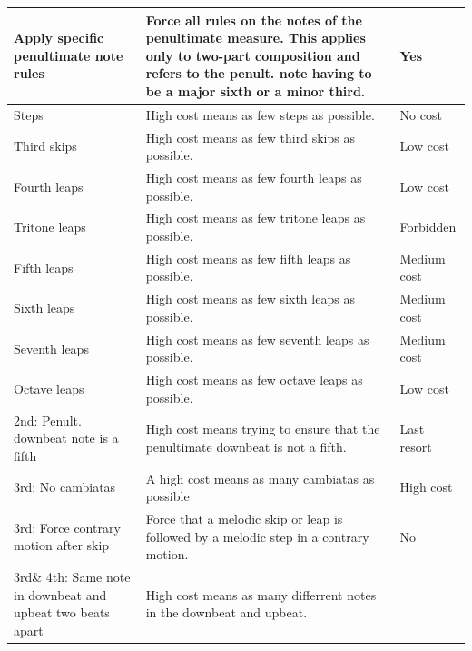 \begin{table}[!h]
\begin{adjustbox}{center}
\begin{tabular}{|m{}|m{}|m{}<{\centering}|}
        \cellcolor[HTML]{C8D6FF}Apply specific penultimate note rules &
          Force all rules on the notes of the penultimate measure. This applies only to two-part composition and  refers to the penult. note having to be a major sixth or a minor third. &
          Yes \\ \hline
        \hline
        \cellcolor[HTML]{BCE08D}Steps &
          High cost means as few steps as possible. &
          No cost \\ \hline
        \cellcolor[HTML]{BCE08D}Third skips &
          High cost means as few third skips as possible. &
          Low cost \\ \hline
        \cellcolor[HTML]{BCE08D}Fourth leaps &
          High cost means as few fourth leaps as possible. &
          Low cost \\ \hline
        \cellcolor[HTML]{BCE08D}Tritone leaps&
          High cost means as few tritone leaps as possible. &
          Forbidden \\ \hline
        \cellcolor[HTML]{BCE08D}Fifth leaps&
          High cost means as few fifth leaps as possible. &
          Medium cost \\ \hline
        \cellcolor[HTML]{BCE08D}Sixth leaps&
          High cost means as few sixth leaps as possible. &
          Medium cost \\ \hline
        \cellcolor[HTML]{BCE08D}Seventh leaps&
          High cost means as few seventh leaps as possible. &
          Medium cost \\ \hline
        \cellcolor[HTML]{BCE08D}Octave leaps&
          High cost means as few octave leaps as possible. &
          Low cost \\ \hline
        \hline      
        \cellcolor[HTML]{FFCE93}2nd: Penult. downbeat note is a fifth &
          High cost means trying to ensure that the penultimate downbeat is not a fifth.&
          Last resort \\ \hline
        \cellcolor[HTML]{FFCE93}3rd: No cambiatas &
          A high cost means as many cambiatas as possible &
          High cost \\ \hline
        \cellcolor[HTML]{FFCE93}3rd: Force contrary motion after skip &
          Force that a melodic skip or leap is followed by a melodic step in a contrary motion. &
          No \\ \hline
        \cellcolor[HTML]{FFCE93}3rd\& 4th: Same note in downbeat and upbeat two beats apart &
          High cost means as many differrent notes in the downbeat and upbeat.&

\end{tabular}
\end{adjustbox}
\end{table}
